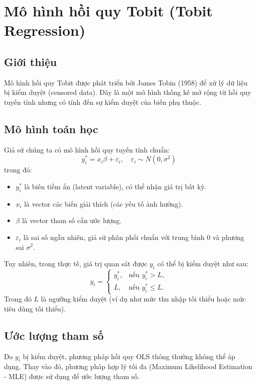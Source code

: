 \chapter{Mô hình hồi quy Tobit (Tobit Regression)}
\section{Giới thiệu}
Mô hình hồi quy Tobit được phát triển bởi James Tobin (1958) để xử lý dữ liệu bị kiểm duyệt (censored data). Đây là một mô hình thống kê mở rộng từ hồi quy tuyến tính nhưng có tính đến sự kiểm duyệt của biến phụ thuộc.

\section{Mô hình toán học}
Giả sử chúng ta có mô hình hồi quy tuyến tính chuẩn:
\begin{equation}
    y_i^* = x_i \beta + \varepsilon_i, \quad \varepsilon_i \sim N(0, \sigma^2)
\end{equation}
trong đó:
\begin{itemize}
    \item $y_i^*$ là biến tiềm ẩn (latent variable), có thể nhận giá trị bất kỳ.
    \item $x_i$ là vector các biến giải thích (các yếu tố ảnh hưởng).
    \item $\beta$ là vector tham số cần ước lượng.
    \item $\varepsilon_i$ là sai số ngẫu nhiên, giả sử phân phối chuẩn với trung bình 0 và phương sai $\sigma^2$.
\end{itemize}

Tuy nhiên, trong thực tế, giá trị quan sát được $y_i$ có thể bị kiểm duyệt như sau:
\begin{equation}
    y_i = \begin{cases}
        y_i^*, & \text{nếu } y_i^* > L, \\
        L, & \text{nếu } y_i^* \leq L.
    \end{cases}
\end{equation}
Trong đó $L$ là ngưỡng kiểm duyệt (ví dụ như mức thu nhập tối thiểu hoặc mức tiêu dùng tối thiểu).

\section{Ước lượng tham số}
Do $y_i$ bị kiểm duyệt, phương pháp hồi quy OLS thông thường không thể áp dụng. Thay vào đó, phương pháp hợp lý tối đa (Maximum Likelihood Estimation - MLE) được sử dụng để ước lượng tham số.

